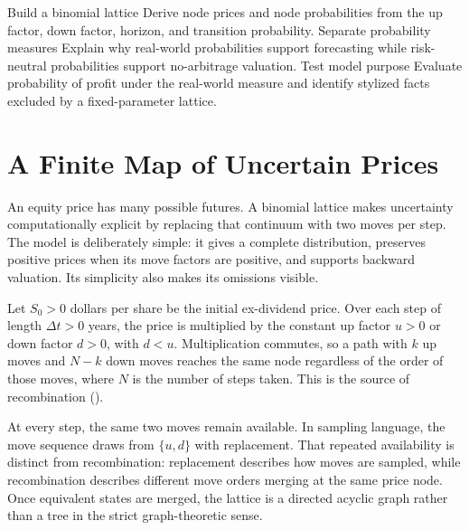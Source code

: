 \documentclass[11pt]{article}
\begin{document}

\learningobjectives
  {Build a binomial lattice}
  {Derive node prices and node probabilities from the up factor, down factor, horizon, and transition probability.}
  {Separate probability measures}
  {Explain why real-world probabilities support forecasting while risk-neutral probabilities support no-arbitrage valuation.}
  {Test model purpose}
  {Evaluate probability of profit under the real-world measure and identify stylized facts excluded by a fixed-parameter lattice.}

\section{A Finite Map of Uncertain Prices}

An equity price has many possible futures. A binomial lattice makes uncertainty computationally explicit by replacing that continuum with two moves per step. The model is deliberately simple: it gives a complete distribution, preserves positive prices when its move factors are positive, and supports backward valuation. Its simplicity also makes its omissions visible.

Let $S_0>0$ dollars per share be the initial ex-dividend price. Over each step of length $\Delta t>0$ years, the price is multiplied by the constant up factor $u>0$ or down factor $d>0$, with $d<u$. Multiplication commutes, so a path with $k$ up moves and $N-k$ down moves reaches the same node regardless of the order of those moves, where $N$ is the number of steps taken. This is the source of recombination ().

At every step, the same two moves remain available. In sampling language, the move sequence draws from $\{u,d\}$ with replacement. That repeated availability is distinct from recombination: replacement describes how moves are sampled, while recombination describes different move orders merging at the same price node. Once equivalent states are merged, the lattice is a directed acyclic graph rather than a tree in the strict graph-theoretic sense.
\end{document}
